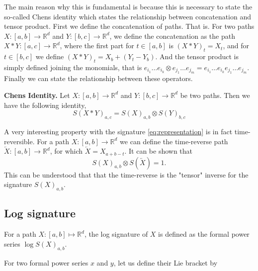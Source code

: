 The main reason why this is fundamental is because this is necessary to state the so-called Chens identity which states the relationship between concatenation and tensor product. First we define the concatenation of paths. That is. For two paths $X: \left[ a,b \right] \to \mathbb{R} ^{d}$  and $Y : \left[ b,c \right]
\to  \mathbb{R} ^{d}$, we define the concatenation as the path $X * Y : \left[ a,c \right]  \to \mathbb{R} ^{d}$, where the first part for $t \in  \left[ a,b \right] $ is $( X* Y) _{t} = X_{t}$, and for $t \in  \left[ b,c \right] $ we define $( X*Y)
_{t} = X_{b} + ( Y_{t} - Y_{b}) $. And the tensor product is simply defined joining the monomials, that is  $e_{i_{1}} \ldots e_{i_{k}} \otimes e_{j_{1}} \ldots e_{j_{m}}  = e_{i_{1}} \ldots e_{i_{k}}  e_{j_{1}} \ldots e_{j_{m}}$. Finally we can
state the relationship between these operators.

\begin{theorem}
    \textbf{Chens Identity.} Let $X: \left[ a,b \right] \to  \mathbb{R} ^{d}$ and $Y: \left[ b,c \right] \to \mathbb{R} ^{d}$ be two paths. Then we have the following identity,
    \begin{equation}
        S( X*Y) _{a,c} = S( X) _{a,b} \otimes  S( Y) _{b,c}
    \end{equation}

\end{theorem}


A very interesting property with the signature \eqref{eq:representation} is in fact time-reversible. For a path $X: \left[ a,b \right]  \to \mathbb{R} ^{d}$ we can define the time-reverse path $\overleftarrow{X}: \left[ a,b \right]  \to  \mathbb{R} ^{d} $, for
which $ \overleftarrow{X}  = X_{a+b -t}$. It can be shown that \begin{equation}
    S( X) _{a,b} \otimes S( \overleftarrow{X}) = 1.
\end{equation}
This can be understood that that the time-reverse is the "tensor" inverse for the signature $S( X) _{a,b}$.


\subsection{Log signature}%
\label{sub:log_signature}


For a path $X : [a, b] \mapsto \mathbb{R}^d$, the log signature of $X$ is defined as the formal power series $\log S(X)_{a,b}$.

For two formal power series $x$ and $y$, let us define their Lie bracket by

